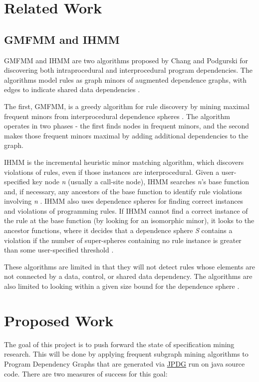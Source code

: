 \documentclass[12pt]{article}
\begin{document}
\section{Related Work}
\subsection{GMFMM and IHMM}
GMFMM and IHMM are two algorithms proposed by Chang and Podgurski for discovering both intraprocedural and interprocedural program dependencies. The algorithms model rules as graph minors of augmented dependence graphs, with edges to indicate shared data dependencies \cite{DBLP:journals/smr/ChangP12}.

The first, GMFMM, is a greedy algorithm for rule discovery by mining maximal frequent minors from interprocedural dependence spheres \cite{DBLP:journals/smr/ChangP12}. The algorithm operates in two phases - the first finds nodes in frequent minors, and the second makes those frequent minors maximal by adding additional dependencies to the graph.

IHMM is the incremental heuristic minor matching algorithm, which discovers violations of rules, even if those instances are interprocedural. Given a user-specified key node \textit{n} (usually a call-site node), IHMM searches \textit{n}'s base function and, if necessary, any ancestors of the base function to identify rule violations involving \textit{n} \cite{DBLP:journals/smr/ChangP12}. IHMM also uses dependence spheres for finding correct instances and violations of programming rules. If IHMM cannot find a correct instance of the rule at the base function (by looking for an isomorphic minor), it looks to the ancestor functions, where it decides that a dependence sphere \textit{S} contains a violation if the number of super-spheres containing no rule instance is greater than some user-specified threshold \cite{DBLP:journals/smr/ChangP12}.

These algorithms are limited in that they will not detect rules whose elements are not connected by a data, control, or shared data dependency. The algorithms are also limited to looking within a given size bound for the dependence sphere \cite{DBLP:journals/smr/ChangP12}.

\section{Proposed Work}
The goal of this project is to push forward the state of specification mining research. This will be done by applying frequent subgraph mining algorithms to Program Dependency Graphs that are generated via \hyperref[subsection:JPDG]{JPDG} run on java source code. There are two measures of success for this goal:
\end{document}
